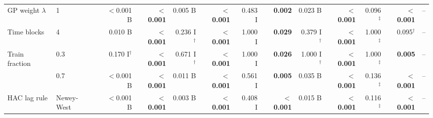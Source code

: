 \begin{tabular}{llrrrrrrrrrrr}
GP weight $\lambda$ & 1 & $<$0.001 B & \textbf{$<$0.001} & 0.005 B & \textbf{$<$0.001} & 0.483 I & \textbf{0.002} & 0.023 B & \textbf{$<$0.001} & 0.096$^\ddagger$ & \textbf{$<$0.001} & -- \\
Time blocks & 4 & 0.010 B & \textbf{$<$0.001} & 0.236 I$^\dagger$ & \textbf{$<$0.001} & 1.000 I & \textbf{0.029} & 0.379 I$^\dagger$ & \textbf{$<$0.001} & 1.000$^\ddagger$ & 0.095$^\dagger$ & -- \\
Train fraction & 0.3 & 0.170 I$^\dagger$ & \textbf{$<$0.001} & 0.671 I$^\dagger$ & \textbf{$<$0.001} & 1.000 I & \textbf{0.026} & 1.000 I$^\dagger$ & \textbf{$<$0.001} & 1.000$^\ddagger$ & \textbf{0.005} & -- \\
 & 0.7 & $<$0.001 B & \textbf{$<$0.001} & 0.011 B & \textbf{$<$0.001} & 0.561 I & \textbf{0.005} & 0.035 B & \textbf{$<$0.001} & 0.136$^\ddagger$ & \textbf{$<$0.001} & -- \\
HAC lag rule & Newey-West & $<$0.001 B & \textbf{$<$0.001} & 0.003 B & \textbf{$<$0.001} & 0.408 I & \textbf{$<$0.001} & 0.015 B & \textbf{$<$0.001} & 0.116$^\ddagger$ & \textbf{$<$0.001} & -- \\
\bottomrule
\end{tabular}
